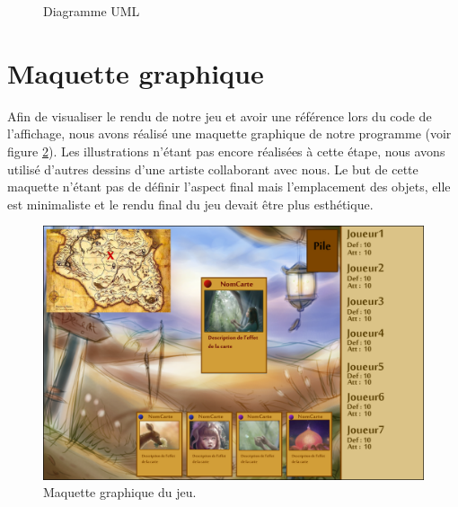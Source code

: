 \documentclass[12pt]{report}
\begin{document}
	\begin{figure}
		\caption{Diagramme UML}
		\label{fig:UML}
	\end{figure}

  \section{Maquette graphique}
  Afin de visualiser le rendu de notre jeu et avoir une référence lors du code de l'affichage, nous avons réalisé une maquette graphique de notre programme (voir figure \ref{fig:maquette}). Les illustrations n'étant pas encore réalisées à cette étape, nous avons utilisé d'autres dessins d'une artiste collaborant avec nous. Le but de cette maquette n'étant pas de définir l'aspect final mais l'emplacement des objets, elle est minimaliste et le rendu final du jeu devait être plus esthétique.\\[1.5cm]

  \begin{figure}[h!]
  	\centering
    \includegraphics[scale=2.8]{images/mock-up.png}
    \caption{Maquette graphique du jeu.}
    \label{fig:maquette}
  \end{figure}
\end{document}
